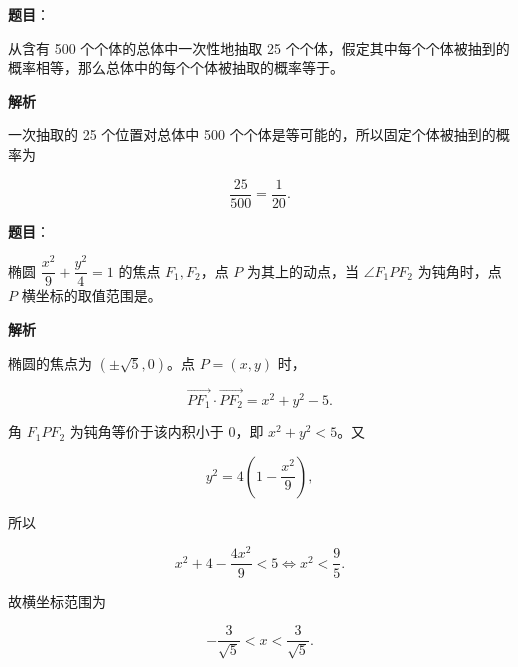 \begin{answer}

\textbf{题目}：

从含有 500 个个体的总体中一次性地抽取 25 个个体，假定其中每个个体被抽到的概率相等，那么总体中的每个个体被抽取的概率等于\gkblank{}。

\textbf{解析}

一次抽取的 25 个位置对总体中 500 个个体是等可能的，所以固定个体被抽到的概率为

\nopagebreak[4]
\[
\frac{25}{500}=\frac1{20}.
\]


\end{answer}
\begin{answer}

\textbf{题目}：

椭圆 $\dfrac{x^2}{9}+\dfrac{y^2}{4}=1$ 的焦点 $F_1,F_2$，点 $P$ 为其上的动点，当 $\angle F_1PF_2$ 为钝角时，点 $P$ 横坐标的取值范围是\gkblank{}。

\textbf{解析}

椭圆的焦点为 $(\pm\sqrt5,0)$。点 $P=(x,y)$ 时，

\nopagebreak[4]
\[
\overrightarrow{PF_1}\cdot\overrightarrow{PF_2}=x^2+y^2-5.
\]

角 $F_1PF_2$ 为钝角等价于该内积小于 $0$，即 $x^2+y^2<5$。又

\nopagebreak[4]
\[
y^2=4\left(1-\frac{x^2}{9}\right),
\]

所以

\nopagebreak[4]
\[
x^2+4-\frac{4x^2}{9}<5
\Longleftrightarrow x^2<\frac95.
\]

故横坐标范围为

\nopagebreak[4]
\[
-\frac3{\sqrt5}<x<\frac3{\sqrt5}.
\]


\end{answer}
